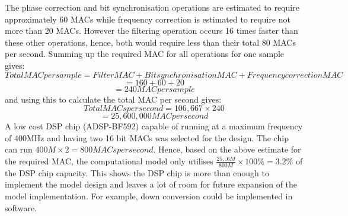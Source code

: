 The phase correction and bit synchronisation operations are estimated to require approximately 60 MACs while frequency correction is estimated to require not more than 20 MACs.  However the filtering operation occurs 16 times faster than these other operations, hence, both would require less than their total 80 MACs per second.  Summing up the required MAC for all operations for one sample gives:
	\[ Total MAC per sample = Filter MAC + Bit synchronisation MAC + Frequency correction MAC	\]
	\[			  = 160 + 60 + 20	\]
	\[			  = 240 MAC per sample		\]
and using this to calculate the total MAC per second gives:
	\[ Total MACs per second = 106,667 \times 240		\]
	\[ 						 = 25,600,000 MAC per second \]
A low cost DSP chip (ADSP-BF592) capable of running at a maximum frequency of 400MHz and having two 16 bit MACs was selected for the design.  The chip can run \(400M \times 2 = 800 MACs per second \).  Hence, based on the above estimate for the required MAC, the computational model only utilises \( \frac{25,.6M}{800M} \times 100\% = 3.2\% \) of the DSP chip capacity.  This shows the DSP chip is more than enough to implement the model design and leaves a lot of room for future expansion of the model implementation.  For example, down conversion could be implemented in software.



